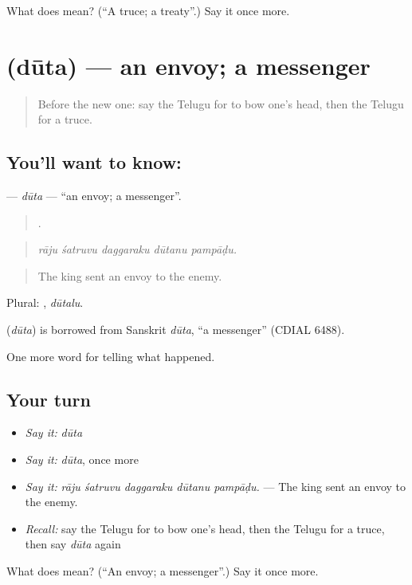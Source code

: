\begin{tcolorbox}[breakable,colback=teal!4,colframe=teal!35!black,title={Before you move on}]
What does  mean? (\textquotedblleft{}A truce; a treaty\textquotedblright{}.) Say it once more.
\end{tcolorbox}
\section[\texorpdfstring{\te{దూత} (dūta)}{దూత (dūta)}]{ (dūta) — an envoy; a messenger}

\label{lesson:TE-C362-duta}



\begin{quote}
Before the new one: say the Telugu for to bow one's head, then the Telugu for a truce.
\end{quote}

\subsection*{You'll want to know: }
\textbf{} — \emph{dūta} — \textquotedblleft{}an envoy; a messenger\textquotedblright{}.

\begin{quote}
    .
\end{quote}

\begin{quote}
\emph{rāju śatruvu daggaraku dūtanu pampāḍu.}
\end{quote}

\begin{quote}
The king sent an envoy to the enemy.
\end{quote}

Plural: , \emph{dūtalu}.

\begin{cousinweb}
\textbf{} (\emph{dūta}) is borrowed from Sanskrit \emph{dūta}, \textquotedblleft{}a messenger\textquotedblright{} (CDIAL 6488).
\end{cousinweb}

\begin{grammarlens}[title={What you've built}]
One more word for telling what happened.
\end{grammarlens}

\subsection*{Your turn}
\begin{itemize}
\raggedright
  \item \emph{Say it:} \emph{dūta}
  \item \emph{Say it:} \emph{dūta}, once more
  \item \emph{Say it:} \emph{rāju śatruvu daggaraku dūtanu pampāḍu.} — The king sent an envoy to the enemy.
  \item \emph{Recall:} say the Telugu for to bow one's head, then the Telugu for a truce, then say \emph{dūta} again
\end{itemize}

\begin{tcolorbox}[breakable,colback=teal!4,colframe=teal!35!black,title={Before you move on}]
What does  mean? (\textquotedblleft{}An envoy; a messenger\textquotedblright{}.) Say it once more.
\end{tcolorbox}
